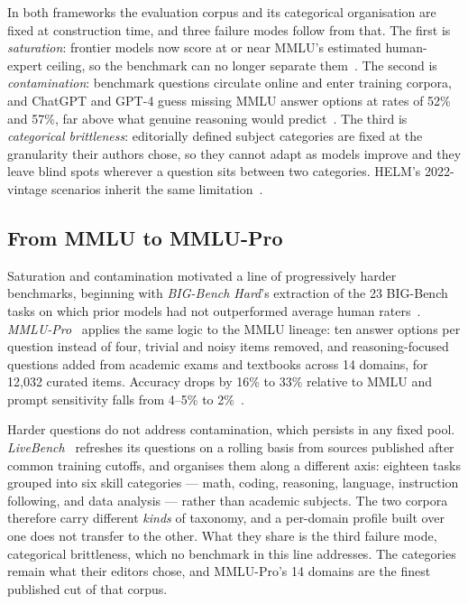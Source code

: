 In both frameworks the evaluation corpus and its categorical
organisation are fixed at construction time, and three failure modes
follow from that. The first is \textit{saturation}: frontier models
now score at or near MMLU's estimated human-expert ceiling, so the
benchmark can no longer separate them~\parencite{hendrycks2021measuring,
wang2024mmlupro}. The second is \textit{contamination}: benchmark
questions circulate online and enter training corpora, and ChatGPT
and GPT-4 guess missing MMLU answer options at rates of 52\% and
57\%, far above what genuine reasoning would
predict~\parencite{deng2024contamination}. The third is
\textit{categorical brittleness}: editorially defined subject
categories are fixed at the granularity their authors chose, so they
cannot adapt as models improve and they leave blind spots wherever a
question sits between two categories. HELM's 2022-vintage scenarios
inherit the same limitation~\parencite{liang2022holistic}.

\subsection*{From MMLU to MMLU-Pro}

Saturation and contamination motivated a line of progressively harder
benchmarks, beginning with \textit{BIG-Bench Hard}'s extraction of
the 23 BIG-Bench tasks on which prior models had not outperformed
average human raters~\parencite{suzgun2022bigbench}.
\textit{MMLU-Pro}~\parencite{wang2024mmlupro} applies the same logic
to the MMLU lineage: ten answer options per question instead of four,
trivial and noisy items removed, and reasoning-focused questions
added from academic exams and textbooks across 14 domains, for
12{,}032 curated items. Accuracy drops by 16\% to 33\% relative to
MMLU and prompt sensitivity falls from 4--5\% to
2\%~\parencite{wang2024mmlupro}.

Harder questions do not address contamination, which persists in any
fixed pool. \textit{LiveBench}~\parencite{white2024livebench} refreshes
its questions on a rolling basis from sources published after common
training cutoffs, and organises them along a different axis: eighteen
tasks grouped into six skill categories --- math, coding, reasoning,
language, instruction following, and data analysis --- rather than
academic subjects. The two corpora therefore carry different
\textit{kinds} of taxonomy, and a per-domain profile built over one
does not transfer to the other. What they share is the third failure
mode, categorical brittleness, which no benchmark in this line
addresses. The categories
remain what their editors chose, and MMLU-Pro's 14 domains are the
finest published cut of that corpus.

